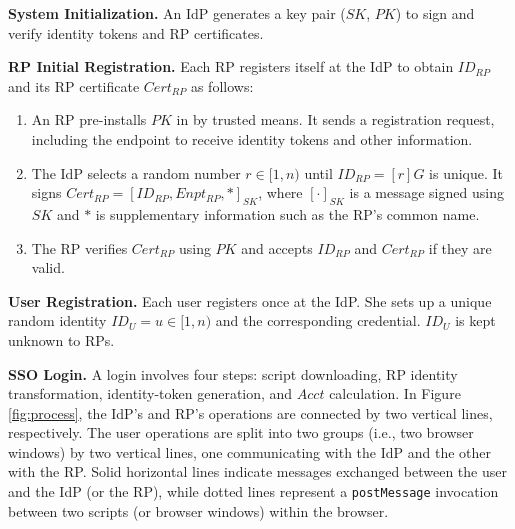 \noindent \textbf{System Initialization.}
An IdP generates a key pair ($SK$, $PK$) to sign and verify identity tokens and RP certificates.

\vspace{0.85mm}
\noindent\textbf{RP Initial Registration.}
Each RP registers itself at the IdP to obtain $ID_{RP}$ and its RP certificate $Cert_{RP}$ as follows:
\vspace{-\topsep}\begin{enumerate}
\setlength{\topsep}{0pt}
\setlength{\partopsep}{0pt}
\setlength{\itemsep}{0pt}
\setlength{\parsep}{0pt}
\setlength{\parskip}{0pt}
\item
An RP pre-installs $PK$ in by trusted means.
It sends a registration request, including the endpoint to receive identity tokens and other information.
\item
The IdP selects a random number $r \in [1,n)$ until $ID_{RP} = [r]G$ is unique.
It signs $Cert_{RP} = [ID_{RP}, Enpt_{RP}, *]_{SK}$,
     where $[\cdot]_{SK}$ is a message signed using $SK$ and $*$ is supplementary information such as the RP's common name.
\item
The RP verifies $Cert_{RP}$ using $PK$ and accepts $ID_{RP}$ and $Cert_{RP}$ if they are valid.
\end{enumerate}


\noindent\textbf{User Registration.}
Each user registers once at the IdP. She sets up a unique random identity $ID_U = u \in [1, n)$ and the corresponding credential. $ID_U$ is kept unknown to RPs.


\vspace{0.85mm}
\noindent\textbf{SSO Login.} A login %
involves four steps: script downloading, RP identity transformation, identity-token generation, and $Acct$ calculation. In Figure \ref{fig:process}, the IdP's and RP's operations are connected by two vertical lines, respectively. The user operations are split into two groups (i.e., two browser windows) by two vertical lines, one communicating with the IdP and the other with the RP. Solid horizontal lines indicate messages exchanged between the user and the IdP (or the RP), while dotted lines represent a \verb+postMessage+ invocation between two scripts (or browser windows) within the browser.


